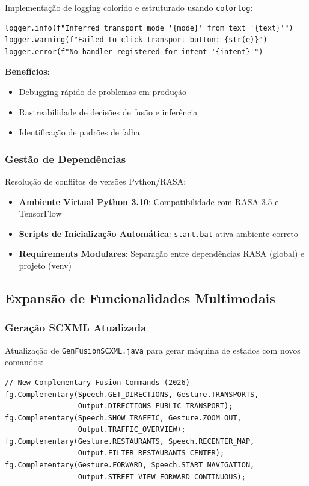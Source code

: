 \documentclass{report}
\begin{document}
Implementação de logging colorido e estruturado usando \texttt{colorlog}:

\begin{verbatim}
logger.info(f"Inferred transport mode '{mode}' from text '{text}'")
logger.warning(f"Failed to click transport button: {str(e)}")
logger.error(f"No handler registered for intent '{intent}'")
\end{verbatim}

\textbf{Benefícios}:
\begin{itemize}
    \item Debugging rápido de problemas em produção
    \item Rastreabilidade de decisões de fusão e inferência
    \item Identificação de padrões de falha
\end{itemize}

\subsubsection{Gestão de Dependências}

Resolução de conflitos de versões Python/RASA:

\begin{itemize}
    \item \textbf{Ambiente Virtual Python 3.10}: Compatibilidade com RASA 3.5 e TensorFlow
    \item \textbf{Scripts de Inicialização Automática}: \texttt{start.bat} ativa ambiente correto
    \item \textbf{Requirements Modulares}: Separação entre dependências RASA (global) e projeto (venv)
\end{itemize}

\subsection{Expansão de Funcionalidades Multimodais}


\subsubsection{Geração SCXML Atualizada}

Atualização de \texttt{GenFusionSCXML.java} para gerar máquina de estados com novos comandos:

\begin{verbatim}
// New Complementary Fusion Commands (2026)
fg.Complementary(Speech.GET_DIRECTIONS, Gesture.TRANSPORTS, 
                 Output.DIRECTIONS_PUBLIC_TRANSPORT);
fg.Complementary(Speech.SHOW_TRAFFIC, Gesture.ZOOM_OUT, 
                 Output.TRAFFIC_OVERVIEW);
fg.Complementary(Gesture.RESTAURANTS, Speech.RECENTER_MAP, 
                 Output.FILTER_RESTAURANTS_CENTER);
fg.Complementary(Gesture.FORWARD, Speech.START_NAVIGATION, 
                 Output.STREET_VIEW_FORWARD_CONTINUOUS);
\end{verbatim}
\end{document}
